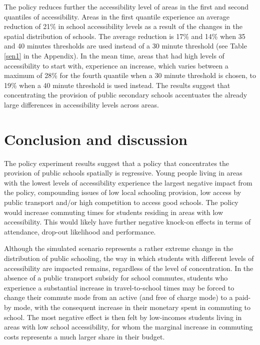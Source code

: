\documentclass[3p,authoryear,preprint,review,12pt]{elsarticle}
\begin{document}
The policy reduces further the accessibility level of areas in the first and second quantiles of accessibility. Areas in the first quantile experience an average reduction of 21\% in school accessibility levels as a result of the changes in the spatial distribution of schools. The average reduction is 17\% and 14\% when 35 and 40 minutes thresholds are used instead of a 30 minute threshold (see Table \ref{sen1} in the Appendix). In
the mean time, areas that had high levels of accessibility to start
with, experience an increase, which varies between a maximum of 28\% for the fourth quantile when a 30 minute threshold is chosen, to 19\% when a 40 minute threshold is used instead. The results suggest that concentrating the provision of public secondary schools accentuates the already large differences in accessibility levels across areas.

\section{Conclusion and discussion}\label{conclusion-and-discussion}

The policy experiment results suggest that a policy that concentrates the provision of public schools spatially is regressive. Young people living in areas with the lowest levels of accessibility experience the largest negative impact from the policy, compounding issues of low local schooling provision, low access by public transport and/or high competition to access good schools. The policy would increase commuting times for students residing in areas with low accessibility. This would likely have further negative knock-on effects in terms of attendance,
drop-out likelihood and performance.

Although the simulated scenario represents a rather extreme change in the distribution of public schooling, the way in which students with different levels of accessibility are impacted remains, regardless of the level of concentration. In the absence of a public transport subsidy for school commutes, students who experience a substantial increase in travel-to-school times may be forced to change their commute mode from an active (and free of charge mode) to a paid-by mode, with the consequent increase in their monetary spent in commuting to school. The most negative effect is then felt by low-incomes students living in areas with low school accessibility, for whom the marginal increase in commuting costs represents a much larger share in their budget.
\end{document}
